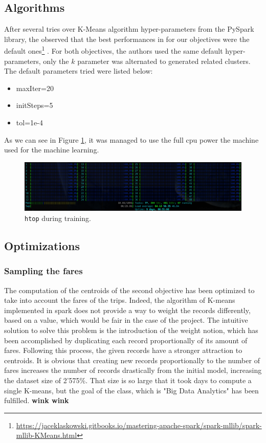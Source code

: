 \documentclass[a4paper]{article}
\begin{document}
\subsection{Algorithms}
After several tries over K-Means algorithm hyper-parameters from the PySpark library, the observed that the best performances in for our objectives were the default ones\footnote{\url{https://jaceklaskowski.gitbooks.io/mastering-apache-spark/spark-mllib/spark-mllib-KMeans.html}} . For both objectives, the authors used the same default hyper-parameters, only the $k$ parameter was alternated to generated related clusters. The default parameters tried were listed below:

\begin{itemize}
  \item maxIter=20
  \item initSteps=5
  \item tol=1e-4
\end{itemize}

As we can see in Figure \ref{fig:ml-cpus-max}, it was managed to use the full cpu power the machine used for the machine learning.

\begin{figure}
  \centering
  \includegraphics[width=\textwidth]{images/htop-full-cpus.png}
  \caption{\texttt{htop} during training.}
  \label{fig:ml-cpus-max}
\end{figure}

\subsection{Optimizations}
\subsubsection{Sampling the fares}
The computation of the centroids of the second objective has been optimized to take into account the fares of the trips. Indeed, the algorithm of K-means implemented in spark does not provide a way to weight the records differently, based on a value, which would be fair in the case of the project. The intuitive solution to solve this problem is the introduction of the weight notion, which has been accomplished by duplicating each record proportionally of its amount of fares. Following this process, the given records have a stronger attraction to centroids. It is obvious that creating new records proportionally to the number of fares increases the number of records drastically from the initial model, increasing the dataset size of 2'575\%. That size is so large that it took days to compute a single K-means, but the goal of the class, which is "Big Data Analytics" has been fulfilled. \textbf{wink wink}
\end{document}
